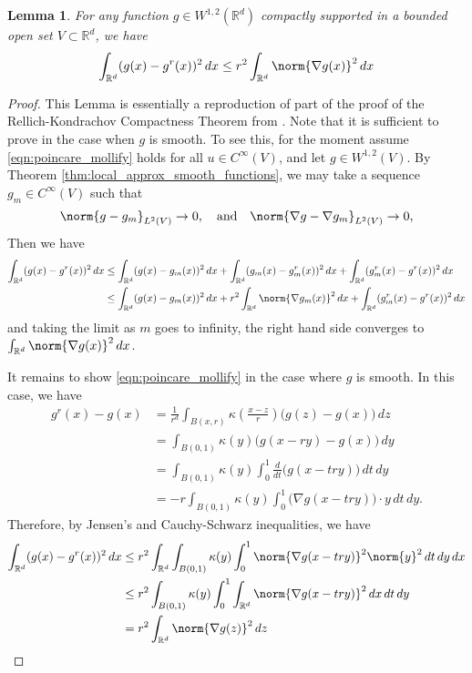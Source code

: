 \documentclass{article}
\newcommand{\Reals}{\mathbb{R}}
\newcommand{\1}{\mathbb{I}}
\newcommand{\Rd}{\Reals^d}
\theoremstyle{alden}
\theoremstyle{aldenthm}
\newtheorem{lemma}{Lemma}
\theoremstyle{definition}
\theoremstyle{remark}
\begin{document}
\begin{lemma}
	\label{lem:poincare_mollify}
	For any function $g \in W^{1,2}(\Rd)$ compactly supported in a bounded open set $V \subset \Rd$, we have
	\begin{equation}
	\label{eqn:poincare_mollify}
	\int_{\Rd} (g(x) - g^r(x))^2 \,dx \leq r^2 \int_{\Rd} \norm{\nabla g(x)}^2 \,dx
	\end{equation}
\end{lemma}
\begin{proof}
	This Lemma is essentially a reproduction of part of the proof of the Rellich-Kondrachov Compactness Theorem from \citep{evans10}. Note that it is sufficient to prove in the case when $g$ is smooth. To see this, for the moment assume \eqref{eqn:poincare_mollify} holds for all $u \in C^{\infty}(V)$, and let $g \in W^{1,2}(V)$. By Theorem \ref{thm:local_approx_smooth_functions}, we may take a sequence $g_m \in C^{\infty}(V)$ such that
	\begin{equation*}
	\norm{g - g_m}_{L^2(V)} \to 0, \quad \textrm{and} \quad \norm{\nabla g - \nabla g_m}_{L^2(V)} \to 0,
	\end{equation*}
	Then we have
	\begin{align*}
	\int_{\Rd} (g(x) - g^r(x))^2 \,dx & \leq \int_{\Rd} (g(x) - g_m(x))^2 \,dx + \int_{\Rd}(g_m(x) - g_m^r(x))^2 \,dx + \int_{\Rd}(g_m^r(x) - g^r(x))^2 \,dx \\
	& \leq \int_{\Rd} (g(x) - g_m(x))^2 \,dx + r^2 \int_{\Rd} \norm{\nabla g_m(x)}^2 \,dx + \int_{\Rd}(g_m^r(x) - g^r(x))^2 \,dx
	\end{align*}
	and taking the limit as $m$ goes to infinity, the right hand side converges to $\int_{\Rd} \norm{\nabla g(x)}^2 \,dx$. 
	
	It remains to show \eqref{eqn:poincare_mollify} in the case where $g$ is smooth. In this case, we have
	\begin{align*}
	g^{r}(x) -  g(x) & = \frac{1}{r^d} \int_{B(x,r)} \kappa \left(\frac{x - z}{r}\right)\bigl(g(z) - g(x)\bigr) \,dz \\
	& = \int_{B(0,1)} \kappa(y) \bigl(g(x - ry) - g(x)\bigr) \,dy \\
	& = \int_{B(0,1)} \kappa(y) \int_{0}^{1} \frac{d}{dt} \bigl(g(x - try) \bigr) \,dt \,dy \\
	& = -r \int_{B(0,1)} \kappa(y) \int_{0}^{1} \bigl(\nabla g (x - try) \bigr) \cdot y \,dt \,dy.
	\end{align*} 
	Therefore, by Jensen's and Cauchy-Schwarz inequalities, we have
	\begin{align*}
	\int_{\Rd} (g(x) - g^r(x))^2 \,dx & \leq r^2 \int_{\Rd} \int_{B(0,1)} \kappa(y) \int_{0}^{1} \norm{\nabla g (x - try)}^2 \norm{y}^2 \,dt \,dy \,dx \\
	& \leq r^2 \int_{B(0,1)} \kappa(y) \int_{0}^{1} \int_{\Rd} \norm{\nabla g (x - try)}^2 \,dx \,dt \,dy \\
	& = r^2 \int_{\Rd} \norm{\nabla g(z)}^2 \,dz
	\end{align*}
\end{proof}
\end{document}
